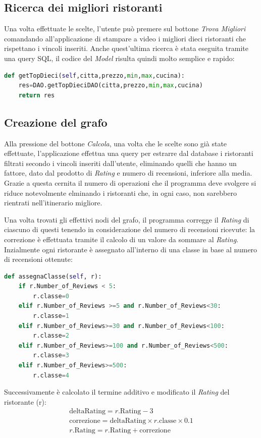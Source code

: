 \documentclass{report}
\begin{document}
\subsection{Ricerca dei migliori ristoranti}\label{sec2_migliori}
Una volta effettuate le scelte, l'utente può premere sul bottone \textit{Trova Migliori} comandando all'applicazione di stampare a video i migliori dieci ristoranti che rispettano i vincoli inseriti. Anche quest'ultima ricerca è stata eseguita tramite una query SQL, il codice del \textit{Model} risulta quindi molto semplice e rapido:
\begin{lstlisting}[language=Python,caption=Codice per ricavare migliori dieci ristoranti]
def getTopDieci(self,citta,prezzo,min,max,cucina):
    res=DAO.getTopDieciDAO(citta,prezzo,min,max,cucina)
    return res
\end{lstlisting}


\subsection{Creazione del grafo}\label{sec2_grafo}
Alla pressione del bottone \textit{Calcola}, una volta che le scelte sono già state effettuate, l'applicazione effettua una query per estrarre dal database i ristoranti filtrati secondo i vincoli inseriti dall'utente, eliminando quelli che hanno un fattore, dato dal prodotto di \textit{Rating} e numero di recensioni, inferiore alla media. Grazie a questa cernita il numero di operazioni che il programma deve svolgere si riduce notevolmente elminando i ristoranti che, in ogni caso, non sarebbero rientrati nell'itinerario migliore.

Una volta trovati gli effettivi nodi del grafo, il programma corregge il \textit{Rating} di ciascuno di questi tenendo in considerazione del numero di recensioni ricevute: la correzione è effettuata tramite il calcolo di un valore da sommare al \textit{Rating}. Inzialmente ogni ristorante è assegnato all'interno di una classe in base al numero di recensioni ottenute:
\begin{lstlisting}[language=Python,caption=funzione che assegna classe ad un ristorante in base al numero di recensioni]
def assegnaClasse(self, r):
    if r.Number_of_Reviews < 5:
        r.classe=0
    elif r.Number_of_Reviews >=5 and r.Number_of_Reviews<30:
        r.classe=1
    elif r.Number_of_Reviews>=30 and r.Number_of_Reviews<100:
        r.classe=2
    elif r.Number_of_Reviews>=100 and r.Number_of_Reviews<500:
        r.classe=3
    elif r.Number_of_Reviews>=500:
        r.classe=4
\end{lstlisting}
Successivamente è calcolato il termine additivo e modificato il \textit{Rating} del ristorante (r):
\begin{align}
\text{deltaRating} = r.\text{Rating} - 3\\
\text{correzione} = \text{deltaRating} \times r.\text{classe} \times 0.1\\
r.\text{Rating} = r.\text{Rating} + \text{correzione}
\end{align}
\end{document}
